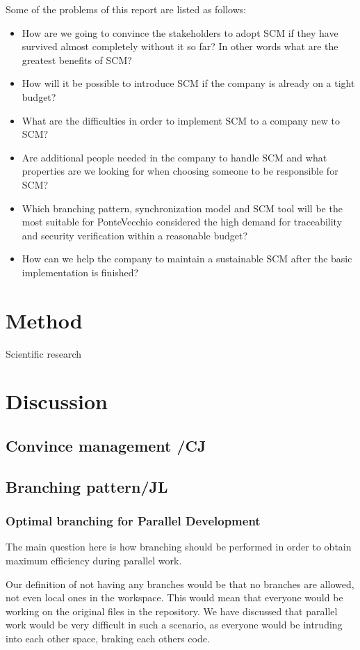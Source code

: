 \documentclass[10pt]{article}
\begin{document}
\hfill \break
\noindent Some of the problems of this report are  listed as follows:
\begin{itemize}
\item How are we going to convince the stakeholders to adopt SCM if they have survived almost completely without it so far? In other words what are the greatest benefits of SCM?
\item How will it be possible to introduce SCM if the company is already on a tight budget?
\item What are the difficulties in order to implement SCM to a company new to SCM?
\item Are additional people needed in the company to handle SCM and what properties are we looking for when choosing someone to be responsible for SCM?
\item Which branching pattern, synchronization model and SCM tool will be the most suitable for PonteVecchio considered the high demand for traceability and security verification within a reasonable budget?
\item How can we help the company to maintain a sustainable SCM after the basic implementation is finished?
\end{itemize}

\section{Method}
Scientific research 

\section{Discussion}

\subsection{Convince management /CJ}

\subsection{Branching pattern/JL}
\subsubsection{Optimal branching for Parallel Development}
The main question here is how branching should be performed in order to obtain maximum efficiency during parallel work. 

\noindent Our definition of not having any branches would be that no branches are allowed, not even local ones in the workspace. This would mean that everyone would be working on the original files in the repository. We have discussed that parallel work would be very difficult in such a scenario, as everyone would be intruding into each other space, braking each others code.
\end{document}
